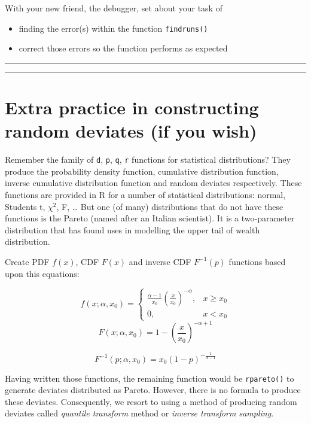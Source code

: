 \documentclass[]{article}
\providecommand{\tightlist}{%
  \setlength{\itemsep}{0pt}\setlength{\parskip}{0pt}}
\begin{document}
With your new friend, the debugger, set about your task of

\begin{itemize}
\tightlist
\item
  finding the error(s) within the function \texttt{findruns()}
\item
  correct those errors so the function performs as expected
\end{itemize}

\begin{center}\rule{0.5\linewidth}{\linethickness}\end{center}

\begin{center}\rule{0.5\linewidth}{\linethickness}\end{center}

\section{Extra practice in constructing random deviates (if you
wish)}\label{extra-practice-in-constructing-random-deviates-if-you-wish}

Remember the family of \texttt{d}, \texttt{p}, \texttt{q}, \texttt{r}
functions for statistical distributions? They produce the probability
density function, cumulative distribution function, inverse cumulative
distribution function and random deviates respectively. These functions
are provided in R for a number of statistical distributions: normal,
Students t, \(\chi^2\), F, \ldots{} But one (of many) distributions that
do not have these functions is the Pareto (named after an Italian
scientist). It is a two-parameter distribution that has found uses in
modelling the upper tail of wealth distribution.

Create PDF \(f(x)\), CDF \(F(x)\) and inverse CDF \(F^{-1}(p)\)
functions based upon this equations:

\[
f(x;\alpha, x_0) =  \left\{
                \begin{aligned}
                  \frac{\alpha-1}{x_0}\left( \frac{x}{x_0} \right)^{-\alpha}, & x \ge x_0\\
                  0, & x \lt x_0
                \end{aligned}
              \right.
\] \[
F(x; \alpha, x_0) = 1 - \left( \frac{x}{x_0}\right)^{-\alpha + 1}
\]

\[
F^{-1}(p; \alpha, x_0) = x_0 \left (1-p \right )^{-\frac{1}{\alpha-1}}
\]

Having written those functions, the remaining function would be
\texttt{rpareto()} to generate deviates distributed as Pareto. However,
there is no formula to produce these deviates. Consequently, we resort
to using a method of producing random deviates called \emph{quantile
transform} method or \emph{inverse transform sampling}.
\end{document}

